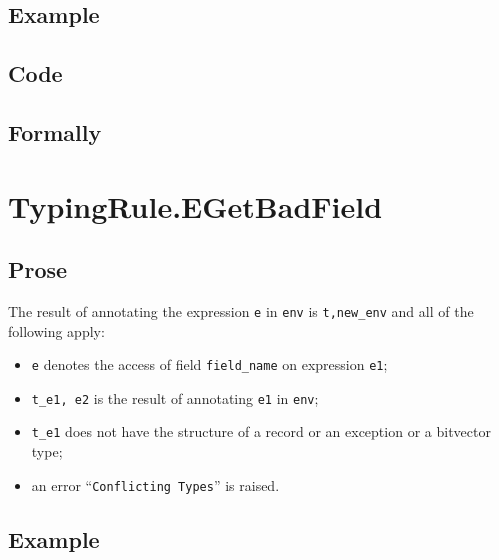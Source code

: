 \documentclass{book}
\begin{document}
  \subsection{Example}

  \subsection{Code}

\begin{emptyformal}
    \subsection{Formally}
\end{emptyformal}


\section{TypingRule.EGetBadField \label{sec:TypingRule.EGetBadField}}

 \subsection{Prose}
  The result of annotating the expression \texttt{e} in \texttt{env} is
\texttt{t,new\_env} and all of the following apply:
   \begin{itemize}
   \item \texttt{e} denotes the access of field \texttt{field\_name} on expression \texttt{e1};
   \item \texttt{t\_e1, e2} is the result of annotating \texttt{e1} in \texttt{env};
   \item \texttt{t\_e1} does not have the structure of a record or an exception or a bitvector type;
   \item an error ``\texttt{Conflicting Types}'' is raised.
   \end{itemize}

 \subsection{Example}
\end{document}
